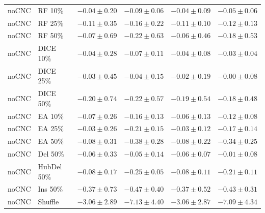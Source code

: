 {\begin{longtable}{llrrrr}
noCNC & RF 10\% & $-0.04\pm0.20$ & $-0.09\pm0.06$ & $-0.04\pm0.09$ & $-0.05\pm0.06$ \\
noCNC & RF 25\% & $-0.11\pm0.35$ & $-0.16\pm0.22$ & $-0.11\pm0.10$ & $-0.12\pm0.13$ \\
noCNC & RF 50\% & $-0.07\pm0.69$ & $-0.22\pm0.63$ & $-0.06\pm0.46$ & $-0.18\pm0.53$ \\
noCNC & DICE 10\% & $-0.04\pm0.28$ & $-0.07\pm0.11$ & $-0.04\pm0.08$ & $-0.03\pm0.04$ \\
noCNC & DICE 25\% & $-0.03\pm0.45$ & $-0.04\pm0.15$ & $-0.02\pm0.19$ & $-0.00\pm0.08$ \\
noCNC & DICE 50\% & $-0.20\pm0.74$ & $-0.22\pm0.57$ & $-0.19\pm0.54$ & $-0.18\pm0.48$ \\
noCNC & EA 10\% & $-0.07\pm0.26$ & $-0.16\pm0.13$ & $-0.06\pm0.13$ & $-0.12\pm0.08$ \\
noCNC & EA 25\% & $-0.03\pm0.26$ & $-0.21\pm0.15$ & $-0.03\pm0.12$ & $-0.17\pm0.14$ \\
noCNC & EA 50\% & $-0.08\pm0.31$ & $-0.38\pm0.28$ & $-0.08\pm0.22$ & $-0.34\pm0.25$ \\
noCNC & Del 50\% & $-0.06\pm0.33$ & $-0.05\pm0.14$ & $-0.06\pm0.07$ & $-0.01\pm0.08$ \\
noCNC & HubDel 50\% & $-0.08\pm0.17$ & $-0.25\pm0.05$ & $-0.08\pm0.11$ & $-0.21\pm0.11$ \\
noCNC & Ins 50\% & $-0.37\pm0.73$ & $-0.47\pm0.40$ & $-0.37\pm0.52$ & $-0.43\pm0.31$ \\
noCNC & Shuffle & $-3.06\pm2.89$ & $-7.13\pm4.40$ & $-3.06\pm2.87$ & $-7.09\pm4.34$ \\
\end{longtable}
}

